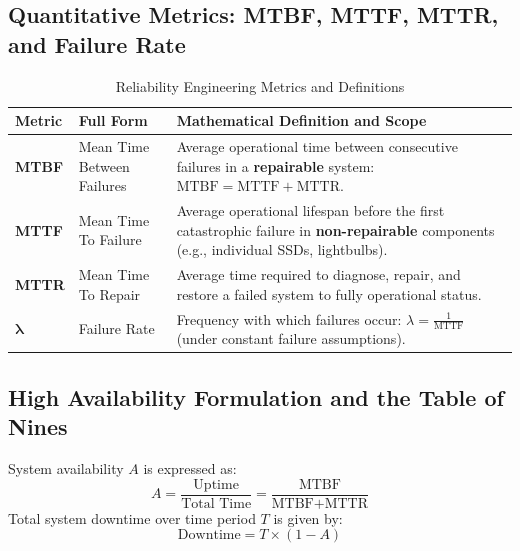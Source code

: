 \subsection{Quantitative Metrics: MTBF, MTTF, MTTR, and Failure Rate}
\begin{table}[htbp]
\centering
\small
\caption{Reliability Engineering Metrics and Definitions}
\label{tab:reliability_metrics}
\begin{tabularx}{\textwidth}{l p{4.2cm} X}
\toprule
\textbf{Metric} & \textbf{Full Form} & \textbf{Mathematical Definition and Scope} \\
\midrule
\textbf{MTBF} & Mean Time Between Failures & Average operational time between consecutive failures in a \textbf{repairable} system: $\text{MTBF} = \text{MTTF} + \text{MTTR}$. \\
\textbf{MTTF} & Mean Time To Failure & Average operational lifespan before the first catastrophic failure in \textbf{non-repairable} components (e.g., individual SSDs, lightbulbs). \\
\textbf{MTTR} & Mean Time To Repair & Average time required to diagnose, repair, and restore a failed system to fully operational status. \\
$\mathbf{\lambda}$ & Failure Rate & Frequency with which failures occur: $\lambda = \frac{1}{\text{MTTF}}$ (under constant failure assumptions). \\
\bottomrule
\end{tabularx}
\end{table}

\subsection{High Availability Formulation and the Table of Nines}
System availability $A$ is expressed as:
\begin{equation}
\boxed{A = \frac{\text{Uptime}}{\text{Total Time}} = \frac{\text{MTBF}}{\text{MTBF} + \text{MTTR}}}
\end{equation}
Total system downtime over time period $T$ is given by:
\begin{equation}
\text{Downtime} = T \times (1 - A)
\end{equation}

